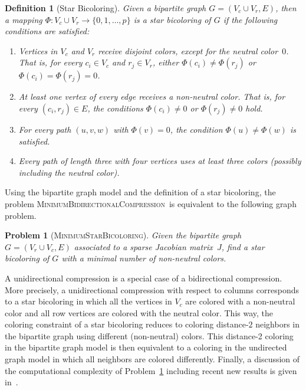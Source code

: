 \documentclass[12pt, oneside]{book}
\newtheorem{problem}{Problem}
\newtheorem{definition}{Definition}
\newcommand{\MinStaBic}{\textsc{MinimumStarBicoloring}}
\newcommand{\MinBidCom}{\textsc{MinimumBidirectionalCompression}}
\begin{document}
\begin{definition}[Star Bicoloring]\label{d.coloring}
Given a bipartite graph $G=(V_c\cup V_r, E)$, then a mapping $\Phi:V_c \cup V_r \to
\{0,1,\dots ,p\}$ is a star bicoloring of $G$ if the following conditions are satisfied:
\begin{enumerate}
\item Vertices in $V_c$ and $V_r$ receive disjoint colors, except for the neutral color~$0$. That
    is, for every $c_i \in V_c$ and $r_j \in V_r$, either $\Phi(c_i) \neq \Phi(r_j)$ or
    $\Phi(c_i)=\Phi(r_j)=0$.

\item At least one vertex of every edge receives a non-neutral color. That is, for every
    $(c_i,r_j)\in E$, the conditions $\Phi(c_i)\neq 0$ or $\Phi(r_j)\neq 0$  hold.

\item For every path $(u,v,w)$ with $\Phi(v) = 0$, the condition $\Phi(u)\neq \Phi(w)$ is
    satisfied.
\item Every path of length three with four vertices uses at least three colors
    (possibly including the neutral color).
\end{enumerate}
\end{definition}

Using the bipartite graph model and the definition of a star bicoloring, the problem
\MinBidCom\ is equivalent to the following graph problem.

\begin{problem}[\MinStaBic]
\label{p.coloring} Given the bipartite graph $G=(V_r\cup V_c, E)$ associated to a sparse Jacobian
matrix~$J$, find a star bicoloring of $G$ with a minimal number of non-neutral colors.
\end{problem}

A unidirectional compression is a special case of a bidirectional compression. More precisely, a
unidirectional compression with respect to columns corresponds to a star bicoloring in which all
the vertices in $V_c$ are colored with a non-neutral color and all row vertices are colored with
the neutral color. This way, the coloring constraint of a star bicoloring reduces to coloring
distance-$2$ neighbors in the bipartite graph using different (non-neutral) colors. This distance-2
coloring in the bipartite graph model is then equivalent to a coloring in the undirected graph
model in which all neighbors are colored differently. Finally, a discussion of the computational
complexity of Problem~\ref{p.coloring} including recent new results is given in~\cite{jj:cjr}.
\end{document}
